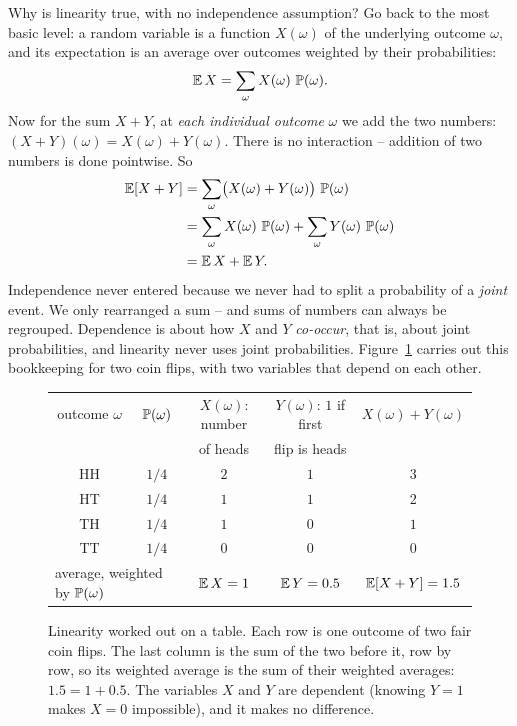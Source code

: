 \begin{whybox}
Why is linearity true, with no independence assumption? Go back to the most
basic level: a random variable is a function $X(\omega)$ of the underlying
outcome $\omega$, and its expectation is an average over outcomes weighted by
their probabilities:
\[
  \E X = \sum_{\omega} X(\omega)\,\P(\omega).
\]
Now for the sum $X + Y$, at \emph{each individual outcome} $\omega$ we add
the two numbers: $(X+Y)(\omega) = X(\omega) + Y(\omega)$. There is no interaction
-- addition of two numbers is done pointwise. So
\begin{align*}
  \E[X+Y] &= \sum_\omega \bigl(X(\omega) + Y(\omega)\bigr)\,\P(\omega)\\
          &= \sum_\omega X(\omega)\,\P(\omega) + \sum_\omega Y(\omega)\,\P(\omega)\\
          &= \E X + \E Y.
\end{align*}
Independence never entered because we never had to split a probability of a
\emph{joint} event. We only rearranged a sum -- and sums of numbers can always be
regrouped. Dependence is about how $X$ and $Y$ \emph{co-occur}, that is, about
joint probabilities, and linearity never uses joint probabilities.
Figure~\ref{ch08:fig-pointwise} carries out this bookkeeping for two coin flips,
with two variables that depend on each other.
\end{whybox}

\begin{figure}[H]
\centering
{\small
\begin{tabular}{ccccc}
\toprule
outcome $\omega$ & $\P(\omega)$ & $X(\omega)$: number & $Y(\omega)$: $1$ if first & $X(\omega)+Y(\omega)$\\
 & & of heads & flip is heads & \\
\midrule
HH & $1/4$ & $2$ & $1$ & $3$\\
HT & $1/4$ & $1$ & $1$ & $2$\\
TH & $1/4$ & $1$ & $0$ & $1$\\
TT & $1/4$ & $0$ & $0$ & $0$\\
\midrule
\multicolumn{2}{l}{average, weighted by $\P(\omega)$} & $\E X = 1$ & $\E Y = 0.5$ & $\E[X+Y] = 1.5$\\
\bottomrule
\end{tabular}}
\caption{Linearity worked out on a table. Each row is one outcome of two fair
coin flips. The last column is the sum of the two before it, row by row, so its
weighted average is the sum of their weighted averages: $1.5 = 1 + 0.5$. The
variables $X$ and $Y$ are dependent (knowing $Y=1$ makes $X=0$ impossible), and
it makes no difference.}
\label{ch08:fig-pointwise}
\end{figure}

